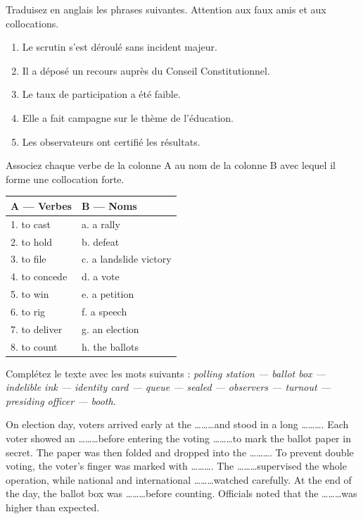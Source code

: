 \documentclass[11pt]{article}
\newcounter{popsec}
\newcounter{popsub}
\newcommand{\courssub}[1]{%
  \stepcounter{popsub}%
  \par\vspace{9pt}\noindent{\popxbold\fontsize{11.5}{13}\selectfont\color{popink}{\color{poporange}\thepopsec.\thepopsub}\hspace{6pt}#1}\par\nopagebreak\vspace{4pt}
}
\begin{document}
\courssub{Je m'entraîne}

\begin{exercice}
Traduisez en anglais les phrases suivantes. Attention aux faux amis et aux collocations.
\begin{enumerate}
\item Le scrutin s'est déroulé sans incident majeur.
\item Il a déposé un recours auprès du Conseil Constitutionnel.
\item Le taux de participation a été faible.
\item Elle a fait campagne sur le thème de l'éducation.
\item Les observateurs ont certifié les résultats.
\end{enumerate}
\end{exercice}

\begin{exercice}
Associez chaque verbe de la colonne A au nom de la colonne B avec lequel il forme une collocation forte.
\begin{center}
\begin{tabular}{|l|l|}
\hline
\rowcolor{popblueL} A — Verbes & B — Noms \\
\hline
1. to cast & a. a rally \\
2. to hold & b. defeat \\
3. to file & c. a landslide victory \\
4. to concede & d. a vote \\
5. to win & e. a petition \\
6. to rig & f. a speech \\
7. to deliver & g. an election \\
8. to count & h. the ballots \\
\hline
\end{tabular}
\end{center}
\end{exercice}

\begin{exercice}
Complétez le texte avec les mots suivants : \emph{polling station — ballot box — indelible ink — identity card — queue — sealed — observers — turnout — presiding officer — booth}.
\begin{textebox}
On election day, voters arrived early at the \ldots\ldots\ldots and stood in a long \ldots\ldots\ldots. Each voter showed an \ldots\ldots\ldots before entering the voting \ldots\ldots\ldots to mark the ballot paper in secret. The paper was then folded and dropped into the \ldots\ldots\ldots. To prevent double voting, the voter's finger was marked with \ldots\ldots\ldots. The \ldots\ldots\ldots supervised the whole operation, while national and international \ldots\ldots\ldots watched carefully. At the end of the day, the ballot box was \ldots\ldots\ldots before counting. Officials noted that the \ldots\ldots\ldots was higher than expected.
\end{textebox}
\end{exercice}
\end{document}
